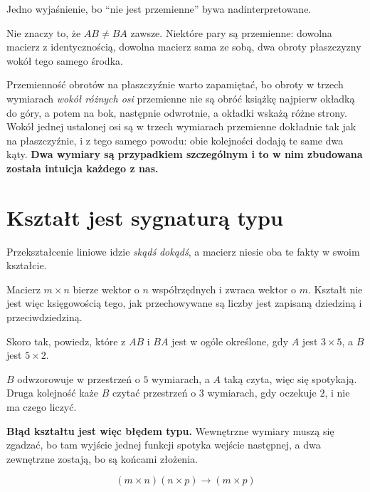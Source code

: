 
\begin{fr}
Jedno wyjaśnienie, bo \enquote{nie jest przemienne} bywa nadinterpretowane.

Nie znaczy to, że $AB \neq BA$ zawsze. Niektóre pary są przemienne: dowolna
macierz z identycznością, dowolna macierz sama ze sobą, dwa obroty płaszczyzny
wokół tego samego środka.

Przemienność obrotów na płaszczyźnie warto zapamiętać, bo obroty w trzech
wymiarach \emph{wokół różnych osi} przemienne nie są \dash{} obróć książkę
najpierw okładką do góry, a potem na bok, następnie odwrotnie, a okładki wskażą
różne strony. Wokół jednej ustalonej osi są w trzech wymiarach przemienne
dokładnie tak jak na płaszczyźnie, i z tego samego powodu: obie kolejności
dodają te same dwa kąty. \textbf{Dwa
wymiary są przypadkiem szczególnym i to w nim zbudowana została intuicja
każdego z nas.}
\end{fr}

\section{Kształt jest sygnaturą typu}
\label{sec:P06-shape}

\begin{fr}
Przekształcenie liniowe idzie \emph{skądś} \emph{dokądś}, a macierz niesie oba
te fakty w swoim kształcie.

Macierz $m \times n$ bierze wektor o $n$ współrzędnych i zwraca wektor o $m$.
Kształt nie jest więc księgowością tego, jak przechowywane są liczby \dash{}
jest zapisaną dziedziną i przeciwdziedziną.

Skoro tak, powiedz, które z $AB$ i $BA$ jest w ogóle określone, gdy $A$ jest
$3 \times 5$, a $B$ jest $5 \times 2$.
\nextframe
\end{fr}

\begin{fr}
$B$ odwzorowuje w przestrzeń o $5$ wymiarach, a $A$ taką czyta, więc się
spotykają. Druga kolejność każe $B$ czytać przestrzeń o $3$ wymiarach, gdy
oczekuje $2$, i nie ma czego liczyć.

\textbf{Błąd kształtu jest więc błędem typu.} Wewnętrzne wymiary muszą się
zgadzać, bo tam wyjście jednej funkcji spotyka wejście następnej, a dwa
zewnętrzne zostają, bo są końcami złożenia.

\[ (m \times n)(n \times p) \longrightarrow (m \times p) \]
\end{fr}


